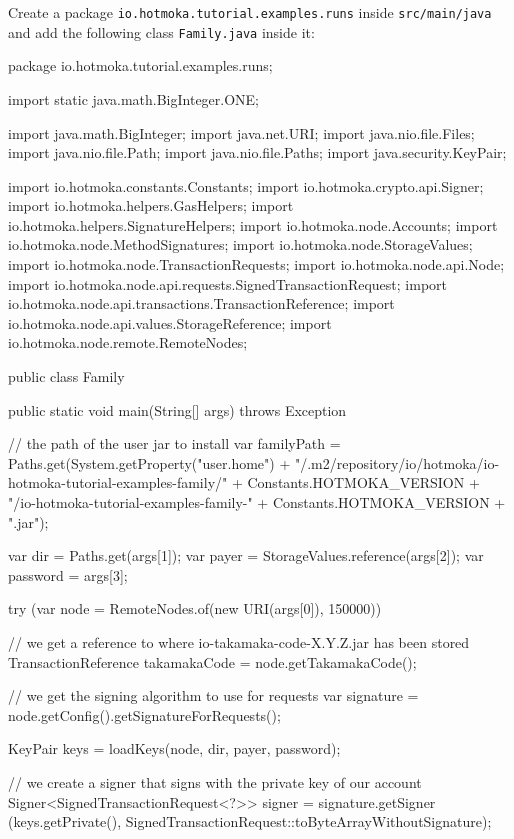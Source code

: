 Create a package \texttt{io.hotmoka.tutorial.examples.runs} inside
\texttt{src/main/java} and add the following class \texttt{Family.java} inside it:
%
\begin{codebox}\begin{javalst}
package io.hotmoka.tutorial.examples.runs;

import static java.math.BigInteger.ONE;

import java.math.BigInteger;
import java.net.URI;
import java.nio.file.Files;
import java.nio.file.Path;
import java.nio.file.Paths;
import java.security.KeyPair;

import io.hotmoka.constants.Constants;
import io.hotmoka.crypto.api.Signer;
import io.hotmoka.helpers.GasHelpers;
import io.hotmoka.helpers.SignatureHelpers;
import io.hotmoka.node.Accounts;
import io.hotmoka.node.MethodSignatures;
import io.hotmoka.node.StorageValues;
import io.hotmoka.node.TransactionRequests;
import io.hotmoka.node.api.Node;
import io.hotmoka.node.api.requests.SignedTransactionRequest;
import io.hotmoka.node.api.transactions.TransactionReference;
import io.hotmoka.node.api.values.StorageReference;
import io.hotmoka.node.remote.RemoteNodes;

public class Family {

  public static void main(String[] args) throws Exception {

    // the path of the user jar to install
    var familyPath = Paths.get(System.getProperty("user.home")
      + "/.m2/repository/io/hotmoka/io-hotmoka-tutorial-examples-family/"
      + Constants.HOTMOKA_VERSION
      + "/io-hotmoka-tutorial-examples-family-" + Constants.HOTMOKA_VERSION + ".jar");

    var dir = Paths.get(args[1]);
    var payer = StorageValues.reference(args[2]);
    var password = args[3];

    try (var node = RemoteNodes.of(new URI(args[0]), 150000)) {
      // we get a reference to where io-takamaka-code-X.Y.Z.jar has been stored
      TransactionReference takamakaCode = node.getTakamakaCode();

      // we get the signing algorithm to use for requests
      var signature = node.getConfig().getSignatureForRequests();

      KeyPair keys = loadKeys(node, dir, payer, password);

      // we create a signer that signs with the private key of our account
      Signer<SignedTransactionRequest<?>> signer = signature.getSigner
      (keys.getPrivate(), SignedTransactionRequest::toByteArrayWithoutSignature);

}}}
\end{javalst}
\end{codebox}
